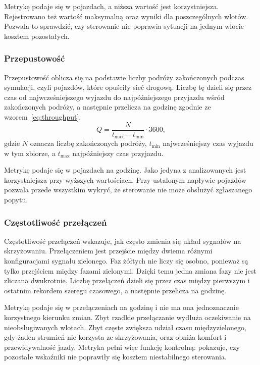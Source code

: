 Metrykę podaje się w pojazdach, a niższa wartość jest korzystniejsza. Rejestrowano też wartość maksymalną oraz wyniki dla poszczególnych wlotów. Pozwala to sprawdzić, czy sterowanie nie poprawia sytuacji na jednym wlocie kosztem pozostałych.

\subsubsection{Przepustowość}
\label{subsubsec:metryka-przepustowosc}

Przepustowość oblicza się na podstawie liczby podróży zakończonych podczas symulacji, czyli pojazdów, które opuściły sieć drogową. Liczbę tę dzieli się przez czas od najwcześniejszego wyjazdu do najpóźniejszego przyjazdu wśród zakończonych podróży, a następnie przelicza na godzinę zgodnie ze wzorem~\ref{eq:throughput}.
\begin{equation}
    Q = \frac{N}{t_{\max} - t_{\min}} \cdot 3600,
    \label{eq:throughput}
\end{equation}
gdzie $N$ oznacza liczbę zakończonych podróży, $t_{\min}$ najwcześniejszy czas wyjazdu w tym zbiorze, a $t_{\max}$ najpóźniejszy czas przyjazdu.

Metrykę podaje się w pojazdach na godzinę. Jako jedyna z analizowanych jest korzystniejsza przy wyższych wartościach. Przy ustalonym napływie pojazdów pozwala przede wszystkim wykryć, że sterowanie nie może obsłużyć zgłaszanego popytu.

\subsubsection{Częstotliwość przełączeń}
\label{subsubsec:metryka-przelaczenia}

Częstotliwość przełączeń wskazuje, jak często zmienia się układ sygnałów na skrzyżowaniu. Przełączeniem jest przejście między dwiema różnymi konfiguracjami sygnału zielonego. Faz żółtych nie liczy się osobno, ponieważ są tylko przejściem między fazami zielonymi. Dzięki temu jedna zmiana fazy nie jest zliczana dwukrotnie. Liczbę przełączeń dzieli się przez czas między pierwszym i ostatnim rekordem szeregu czasowego, a następnie przelicza na godzinę.

Metrykę podaje się w przełączeniach na godzinę i nie ma ona jednoznacznie korzystnego kierunku zmian. Zbyt rzadkie przełączanie wydłuża oczekiwanie na nieobsługiwanych wlotach. Zbyt częste zwiększa udział czasu międzyzielonego, gdy żaden strumień nie korzysta ze skrzyżowania, oraz obniża komfort i przewidywalność jazdy. Metryka pełni więc funkcję kontrolną: pokazuje, czy pozostałe wskaźniki nie poprawiły się kosztem niestabilnego sterowania.

